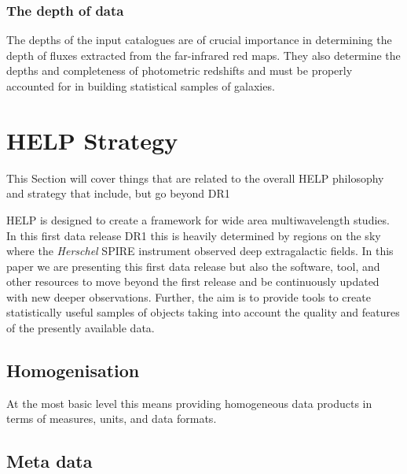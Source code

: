\documentclass[usenatbib]{mnras}
\begin{document}
\subsubsection[The depth of data\\
{\color{red} (no longer needed as this is now a separate paper, but Intro might refer to this paper and subsequent DR1 results sections might relate to this). A section to look at CIRB vs mag and the co-variances of the
multi-wavelength data }]{The depth of data}

The depths of the input catalogues are of crucial importance in determining the depth of fluxes extracted from the far-infrared red maps. They also determine the depths and completeness of photometric redshifts and must be properly accounted for in building statistical samples of galaxies.



\section[HELP Strategy \\
{\color{red} This Section will cover things that are related to the overall HELP philosophy and strategy that include, but go beyond DR1}]{HELP Strategy}
{\color{red} This Section will cover things that are related to the overall HELP philosophy and strategy that include, but go beyond DR1}

HELP is designed to create a framework for wide area multiwavelength studies. In this first data release DR1 this is heavily determined by regions on the sky where the \emph{Herschel} SPIRE instrument observed deep extragalactic fields. In this paper we are presenting this first data release but also the software, tool, and other resources to move beyond the first release and be continuously updated with new deeper observations. Further, the aim is to provide tools to create statistically useful samples of objects taking into account the quality and features of the presently available data. 

\subsection{Homogenisation}

At the most basic level this means providing homogeneous data products in terms of measures, units, and data formats.

\subsection{Meta data}
\end{document}
